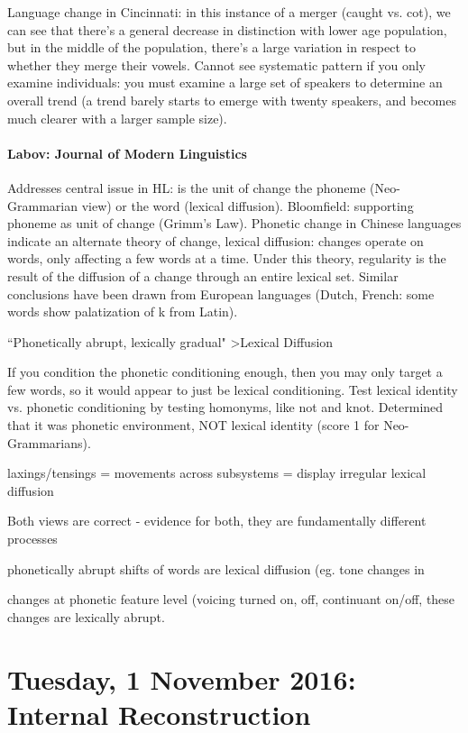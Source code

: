 \documentclass{exam}
\begin{document}
Language change in Cincinnati: in this instance of a merger (caught vs. cot), we can see that there's a general decrease in distinction with lower age population, but in the middle of the population, there's a large variation in respect to whether they merge their vowels. Cannot see systematic pattern if you only examine individuals: you must examine a large set of speakers to determine an overall trend (a trend barely starts to emerge with twenty speakers, and becomes much clearer with a larger sample size). 

\paragraph{Labov: Journal of Modern Linguistics} Addresses central issue in HL: is the unit of change the phoneme (Neo-Grammarian view) or the word (lexical diffusion). Bloomfield: supporting phoneme as unit of change (Grimm's Law). Phonetic change in Chinese languages indicate an alternate theory of change, lexical diffusion: changes operate on words, only affecting a few words at a time. Under this theory, regularity is the result of the diffusion of a change through an entire lexical set. Similar conclusions have been drawn from European languages (Dutch, French: some words show palatization of k from Latin).

``Phonetically abrupt, lexically gradual" >Lexical Diffusion

If you condition the phonetic conditioning enough, then you may only target a few words, so it would appear to just be lexical conditioning.  Test lexical identity vs. phonetic conditioning by testing homonyms, like not and knot. Determined that it was phonetic environment, NOT lexical identity (score 1 for Neo-Grammarians). 

laxings/tensings = movements across subsystems = display irregular lexical diffusion

Both views are correct - evidence for both, they are fundamentally different processes

phonetically abrupt shifts of words are lexical diffusion (eg. tone changes in 

changes at phonetic feature level (voicing turned on, off, continuant on/off, these changes are lexically abrupt. 

\section*{Tuesday, 1 November 2016: Internal Reconstruction}
\end{document}
